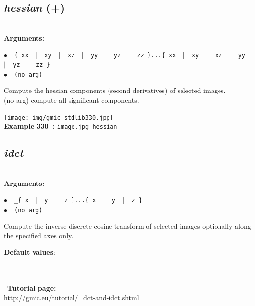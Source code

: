 \documentclass[a4paper,10.5pt,twoside]{book}
\def\comma{\discretionary{,}{}{,}}
\newcommand{\Cb}[1]{\textcolor{cb}{#1}}
\newcommand{\Cc}[1]{\textcolor{cc}{#1}}
\begin{document}
\subsection{\emph{hessian} (+)}\vspace*{-0.7em}
~\\\textbf{\Cb{Arguments: }}\begin{flushleft}
{\small \Cb{\hspace*{0.5cm}$\bullet$~~\texttt{\{ xx ~$|$~ xy ~$|$~ xz ~$|$~ yy ~$|$~ yz ~$|$~ zz \}...\{ xx ~$|$~ xy ~$|$~ xz ~$|$~ yy ~$|$~ yz ~$|$~\- zz \}}}}~~~\\
{\small \Cb{\hspace*{0.5cm}$\bullet$~~\texttt{(no arg)}}}\end{flushleft}
Compute the hessian components (second derivatives) of selected images.
~\\(no arg) compute all significant components.
\begin{center}\texttt{[image: img/gmic\_stdlib330.jpg]}\\
{\footnotesize \textbf{Example 330~:} \texttt{image.jpg hessian}}
\end{center}

\subsection{\emph{idct} }\vspace*{-0.7em}
~\\\textbf{\Cb{Arguments: }}\begin{flushleft}
{\small \Cb{\hspace*{0.5cm}$\bullet$~~\texttt{\_\{ x ~$|$~ y ~$|$~ z \}...\{ x ~$|$~ y ~$|$~ z \}}}}~~~\\
{\small \Cb{\hspace*{0.5cm}$\bullet$~~\texttt{(no arg)}}}\end{flushleft}
Compute the inverse discrete cosine transform of selected images{\comma}
optionally along the specified axes only.
\begin{flushleft}\Cc{\textbf{Default values}:\\~\\\hspace*{0.5cm}{\small $\bullet$~~\texttt{(no arg)}}}\end{flushleft}

~\\
~\textbf{Tutorial page: }\\\url{http://gmic.eu/tutorial/\_dct-and-idct.shtml}
\end{document}
